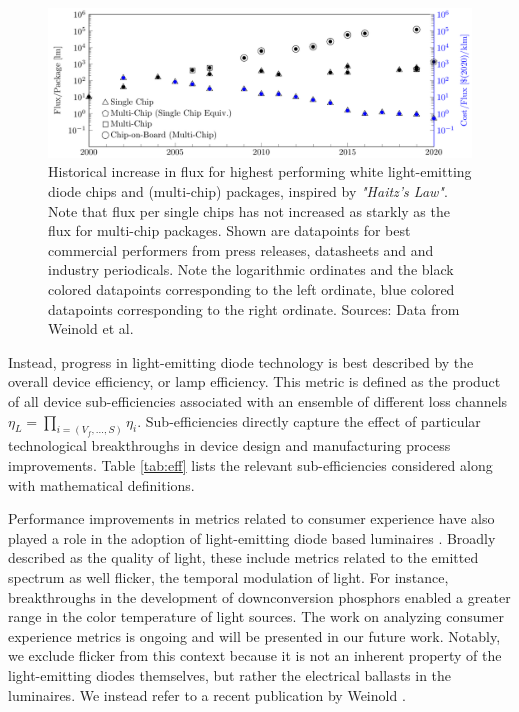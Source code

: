 \documentclass[a4paper,nocompress]{spie}  %
\begin{document}
    \begin{figure} [ht]
        \begin{center}
            \includegraphics[width=\textwidth]{haitz_law_white.pdf}
        \end{center}
        \caption{Historical increase in flux for highest performing white light-emitting diode chips and (multi-chip) packages, inspired by \textit{"Haitz's Law"}\cite{haitz1999case}. Note that flux per single chips has not increased as starkly as the flux for multi-chip packages. Shown are datapoints for best commercial performers from press releases, datasheets and and industry periodicals. Note the logarithmic ordinates and the black colored datapoints corresponding to the left ordinate, blue colored datapoints corresponding to the right ordinate. Sources: Data from Weinold et al. \cite{weinold2020technology}}
        \label{fig:haitz}
    \end{figure}

    Instead, progress in light-emitting diode technology is best described by the overall device efficiency, or lamp efficiency. This metric is defined as the product of all device sub-efficiencies associated with an ensemble of different loss channels $\eta_L = \prod_{i=(V_f,\dots,S)} \eta_i$. Sub-efficiencies directly capture the effect of particular technological breakthroughs in device design and manufacturing process improvements. Table \ref{tab:eff} lists the relevant sub-efficiencies considered along with mathematical definitions.
    
    Performance improvements in metrics related to consumer experience have also played a role in the adoption of light-emitting diode based luminaires \cite{cowan2011understanding}. Broadly described as the quality of light, these include metrics related to the emitted spectrum as well flicker, the temporal modulation of light. For instance, breakthroughs in the development of downconversion phosphors enabled a greater range in the color temperature of light sources. The work on analyzing consumer experience metrics is ongoing and will be presented in our future work. Notably, we exclude flicker from this context because it is not an inherent property of the light-emitting diodes themselves, but rather the electrical ballasts in the luminaires. We instead refer to a recent publication by Weinold \cite{weinold2020long}.
\end{document}
